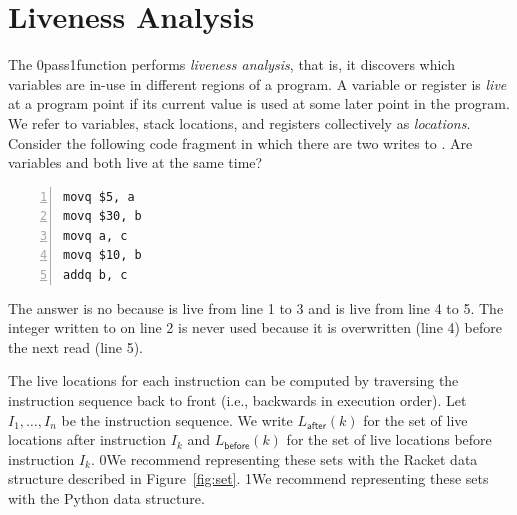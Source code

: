 \documentclass[7x10,nocrop]{TimesAPriori_MIT}%
\def\racketEd{0}
\def\pythonEd{1}
\def\edition{0}
\newcommand{\racket}[1]{{\if\edition\racketEd{#1}\fi}}
\newcommand{\python}[1]{{\if\edition\pythonEd #1\fi}}
\begin{document}

\section{Liveness Analysis}
\label{sec:liveness-analysis-Lvar}

The  \racket{pass}\python{function} performs
\emph{liveness analysis}, that is, it discovers which variables are
in-use in different regions of a program.
%
A variable or register is \emph{live} at a program point if its
current value is used at some later point in the program.  We refer to
variables, stack locations, and registers collectively as
\emph{locations}.
%
Consider the following code fragment in which there are two writes to
. Are variables  and  both live at the same
time?
\begin{center}
  \begin{minipage}{0.96\textwidth}
\begin{lstlisting}[numbers=left,numberstyle=\tiny]
movq $5, a
movq $30, b
movq a, c
movq $10, b
addq b, c
\end{lstlisting}
\end{minipage}
\end{center}
The answer is no because  is live from line 1 to 3 and
 is live from line 4 to 5.  The integer written to  on
line 2 is never used because it is overwritten (line 4) before the
next read (line 5).

The live locations for each instruction can be computed by traversing
the instruction sequence back to front (i.e., backwards in execution
order).  Let $I_1,\ldots, I_n$ be the instruction sequence. We write
$L_{\mathsf{after}}(k)$ for the set of live locations after
instruction $I_k$ and $L_{\mathsf{before}}(k)$ for the set of live
locations before instruction $I_k$.  \racket{We recommend representing
  these sets with the Racket  data structure described in
  Figure~\ref{fig:set}.}  \python{We recommend representing these sets
  with the Python
  \href{https://docs.python.org/3.10/library/stdtypes.html\#set-types-set-frozenset}{\code{set}}
  data structure.}
\end{document}
